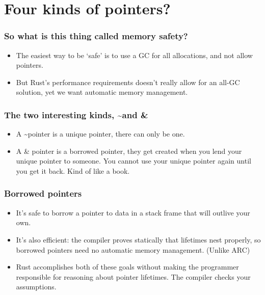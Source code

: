 \documentclass{beamer}
\begin{document}
\section{Four kinds of pointers?}

\begin{frame}
  \frametitle{So what is this thing called memory safety?}

  \begin{itemize}
  \item The easiest way to be `safe' is to use a GC for all allocations, and not allow pointers.
  \item But Rust's performance requirements doesn't really allow for an all-GC solution, yet we want automatic memory management.
  \end{itemize}
\end{frame}



\begin{frame}
  \frametitle{The two interesting kinds, \textasciitilde and \&}

  \begin{itemize}
  \item A \textasciitilde pointer is a unique pointer, there can only be one.
  \item A \& pointer is a borrowed pointer, they get created when you lend your unique pointer to someone. You cannot use your unique pointer again until you get it back. Kind of like a book.
  \end{itemize}
\end{frame}



\begin{frame}
  \frametitle{Borrowed pointers}

  \begin{itemize}
  \item It’s safe to borrow a pointer to data in a stack frame that will outlive your own.
  \item It’s also efficient: the compiler proves statically that lifetimes nest properly, so borrowed pointers need no automatic memory management. (Unlike ARC)
  \item Rust accomplishes both of these goals without making the programmer responsible for reasoning about pointer lifetimes. The compiler checks your assumptions.
  \end{itemize}
\end{frame}
\end{document}
